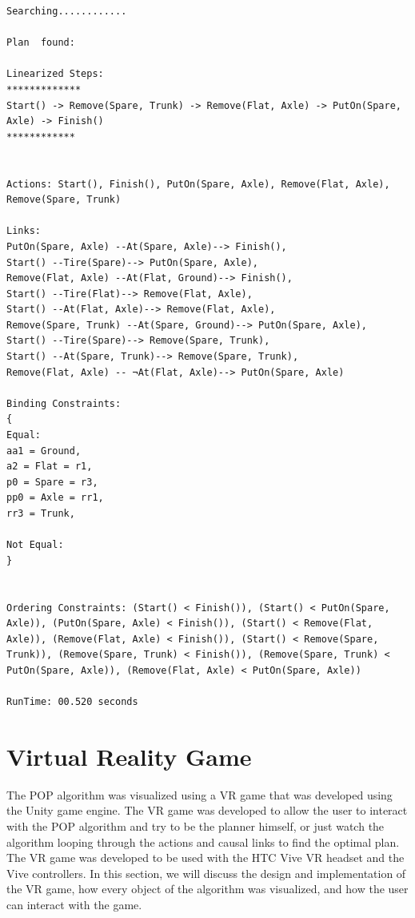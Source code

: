 \begin{lstlisting}[frame=single, basicstyle=\small\ttfamily, breaklines=true, captionpos=b, caption={Spare Tires Problem Output of the Planner}, label={code:spare_tires_output}]
Searching............

Plan  found: 

Linearized Steps:
*************
Start() -> Remove(Spare, Trunk) -> Remove(Flat, Axle) -> PutOn(Spare, Axle) -> Finish()
************


Actions: Start(), Finish(), PutOn(Spare, Axle), Remove(Flat, Axle), Remove(Spare, Trunk)

Links: 
PutOn(Spare, Axle) --At(Spare, Axle)--> Finish(), 
Start() --Tire(Spare)--> PutOn(Spare, Axle), 
Remove(Flat, Axle) --At(Flat, Ground)--> Finish(), 
Start() --Tire(Flat)--> Remove(Flat, Axle), 
Start() --At(Flat, Axle)--> Remove(Flat, Axle), 
Remove(Spare, Trunk) --At(Spare, Ground)--> PutOn(Spare, Axle), 
Start() --Tire(Spare)--> Remove(Spare, Trunk), 
Start() --At(Spare, Trunk)--> Remove(Spare, Trunk), 
Remove(Flat, Axle) -- ¬At(Flat, Axle)--> PutOn(Spare, Axle)

Binding Constraints: 
{
Equal:
aa1 = Ground,
a2 = Flat = r1,
p0 = Spare = r3,
pp0 = Axle = rr1,
rr3 = Trunk,

Not Equal:
}


Ordering Constraints: (Start() < Finish()), (Start() < PutOn(Spare, Axle)), (PutOn(Spare, Axle) < Finish()), (Start() < Remove(Flat, Axle)), (Remove(Flat, Axle) < Finish()), (Start() < Remove(Spare, Trunk)), (Remove(Spare, Trunk) < Finish()), (Remove(Spare, Trunk) < PutOn(Spare, Axle)), (Remove(Flat, Axle) < PutOn(Spare, Axle))

RunTime: 00.520 seconds
\end{lstlisting}



\section{Virtual Reality Game} \label{sec:vr_game}
The \ac{POP} algorithm was visualized using a \ac{VR} game that was developed using the Unity game engine. The \ac{VR} game was developed to allow the user to interact with the \ac{POP} algorithm and try to be the planner himself, or just watch the algorithm looping through the actions and causal links to find the optimal plan. The \ac{VR} game was developed to be used with the HTC Vive \ac{VR} headset and the Vive controllers. In this section, we will discuss the design and implementation of the \ac{VR} game, how every object of the algorithm was visualized, and how the user can interact with the game.


